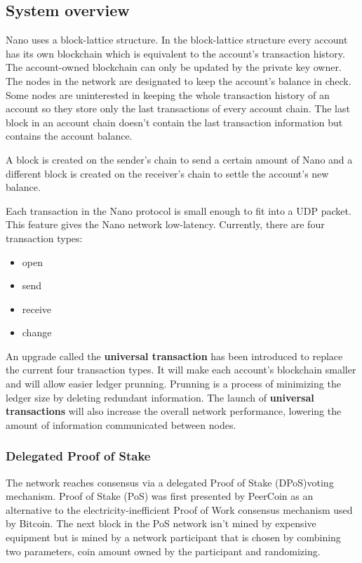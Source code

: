 \documentclass{ferseminar}
\begin{document}
\subsection{System overview}

Nano uses a block-lattice structure. In the block-lattice structure every account has its own blockchain which is equivalent to the account's transaction history. The account-owned blockchain can only be updated by the private key owner. The nodes in the network are designated to keep the account's balance in check. Some nodes are uninterested in keeping the whole transaction history of an account so they store only the last transactions of every account chain. The last block in an account chain doesn't contain the last transaction information but contains the account balance.

A block is created on the sender's chain to send a certain amount of Nano and a different block is created on the receiver's chain to settle the account's new balance.

Each transaction in the Nano protocol is small enough to fit into a UDP packet. This feature gives the Nano network low-latency. Currently, there are four transaction types: 
\begin{itemize}
	\item open
	\item send
	\item receive
	\item change
\end{itemize}

An upgrade called the \textbf{universal transaction} has been introduced to replace the current four transaction types. It will make each account's blockchain smaller and will allow easier ledger prunning. Prunning is a process of minimizing the ledger size by deleting redundant information. The launch of \textbf{universal transactions} will also increase the overall network performance, lowering the amount of information communicated between nodes.


\subsubsection{Delegated Proof of Stake}

The network reaches consensus via a delegated Proof of Stake (DPoS)voting mechanism. Proof of Stake (PoS) was first presented by PeerCoin \cite{Peercoin} as an alternative to the electricity-inefficient Proof of Work consensus mechanism used by Bitcoin. The next block in the PoS network isn't mined by expensive equipment but is mined by a network participant that is chosen by combining two parameters, coin amount owned by the participant and randomizing.
\end{document}

